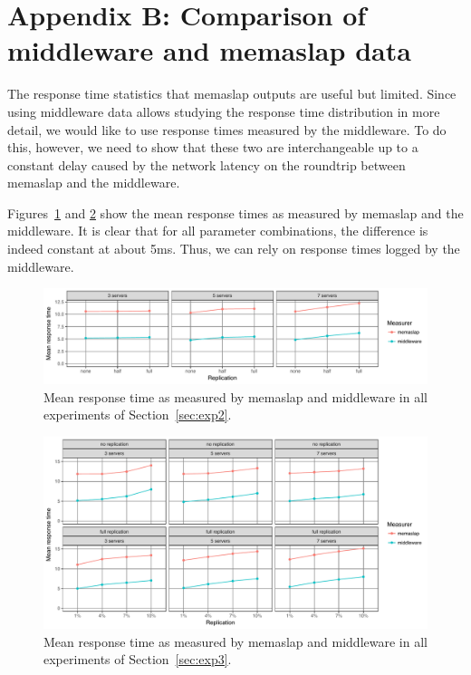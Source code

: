 \documentclass[11pt]{article}
\begin{document}
\clearpage

\section*{Appendix B: Comparison of middleware and memaslap data}
\label{sec:appb}

The response time statistics that memaslap outputs are useful but limited. Since using middleware data allows studying the response time distribution in more detail, we would like to use response times measured by the middleware. To do this, however, we need to show that these two are interchangeable up to a constant delay caused by the network latency on the roundtrip between memaslap and the middleware.

Figures~\ref{fig:appa:comparison:exp2} and \ref{fig:appa:comparison:exp3} show the mean response times as measured by memaslap and the middleware. It is clear that for all parameter combinations, the difference is indeed constant at about 5ms. Thus, we can rely on response times logged by the middleware.

\begin{figure}[h]
\centering
\includegraphics[width=\textwidth]{../results/replication/graphs/compare_mw_ms.pdf}
\caption{Mean response time as measured by memaslap and middleware in all experiments of Section~\ref{sec:exp2}.}
\label{fig:appa:comparison:exp2}
\end{figure}

\begin{figure}[h]
\centering
\includegraphics[width=\textwidth]{../results/writes/graphs/compare_mw_ms.pdf}
\caption{Mean response time as measured by memaslap and middleware in all experiments of Section~\ref{sec:exp3}.}
\label{fig:appa:comparison:exp3}
\end{figure}
\end{document}
